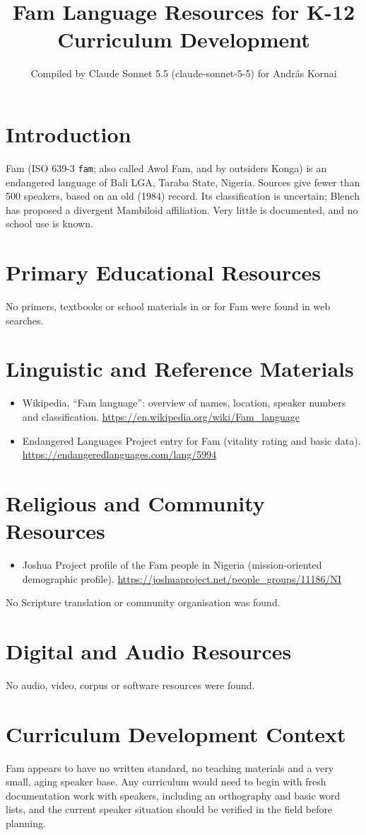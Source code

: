 \documentclass[12pt]{article}
\title{Fam Language Resources for K-12 Curriculum Development}
\author{Compiled by Claude Sonnet 5.5 (claude-sonnet-5-5) for Andr\'as Kornai}
\date{}
\begin{document}
\maketitle

\section{Introduction}
Fam (ISO 639-3 \texttt{fam}; also called Awol Fam, and by outsiders Konga) is an endangered language of Bali LGA, Taraba State, Nigeria. Sources give fewer than 500 speakers, based on an old (1984) record. Its classification is uncertain; Blench has proposed a divergent Mambiloid affiliation. Very little is documented, and no school use is known.

\section{Primary Educational Resources}
No primers, textbooks or school materials in or for Fam were found in web searches.

\section{Linguistic and Reference Materials}
\begin{itemize}
\item Wikipedia, ``Fam language'': overview of names, location, speaker numbers and classification. \url{https://en.wikipedia.org/wiki/Fam_language}
\item Endangered Languages Project entry for Fam (vitality rating and basic data). \url{https://endangeredlanguages.com/lang/5994}
\end{itemize}

\section{Religious and Community Resources}
\begin{itemize}
\item Joshua Project profile of the Fam people in Nigeria (mission-oriented demographic profile). \url{https://joshuaproject.net/people_groups/11186/NI}
\end{itemize}
No Scripture translation or community organisation was found.

\section{Digital and Audio Resources}
No audio, video, corpus or software resources were found.

\section{Curriculum Development Context}
Fam appears to have no written standard, no teaching materials and a very small, aging speaker base. Any curriculum would need to begin with fresh documentation work with speakers, including an orthography and basic word lists, and the current speaker situation should be verified in the field before planning.
\end{document}
